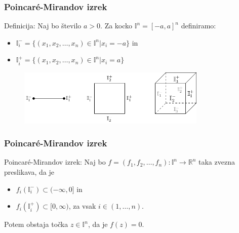 \documentclass[t]{beamer} %
\begin{document}
\begin{frame}
\begin{figure}[h!]
\end{figure}
\end{frame}

\begin{frame}
\frametitle{Poincar\'{e}-Mirandov izrek}
\begin{block}{Definicija:}
Naj bo število $a>0$.
Za kocko $\mathbb{I}^n = [-a, a]^n$ definiramo:
\begin{itemize}
\item $\mathbb{I}_i ^- =\{(x_1, x_2, \dots, x_n) \in \mathbb{I}^n | x_i = -a\}$ in
\item $\mathbb{I}_i ^+ =\{(x_1, x_2, \dots, x_n) \in \mathbb{I}^n | x_i = a\}$
\end{itemize}
\end{block}

\begin{figure}
\includegraphics[width=9cm]{poincare_oznake.pdf}
\end{figure}
\end{frame}


\begin{frame}
\frametitle{Poincar\'{e}-Mirandov izrek}
\begin{block}{Poincar\'{e}-Mirandov izrek:}
Naj bo $f = (f_1, f_2, \dots, f_n) : \mathbb{I}^n \rightarrow \mathbb{R}^n$ taka zvezna preslikava, da je 
\begin{itemize}
\item $f_i (\mathbb{I}_i ^-) \subset (-\infty, 0]$ in
\item $f_i (\mathbb{I}_i ^+) \subset [0, \infty)$, za vsak $i \in (1, \dots, n)$.
\end{itemize}
Potem obstaja točka $z\in \mathbb{I}^n$, da je $f(z) = 0$.
\end{block}
\end{frame}
\end{document}
